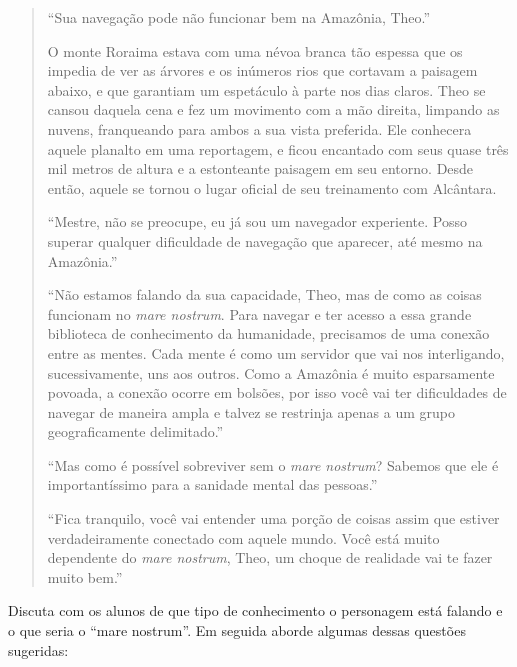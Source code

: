 \documentclass[12pt]{extarticle}
\begin{document}
\begin{quote} ``Sua navegação pode não funcionar bem na Amazônia, Theo.''

O monte Roraima estava com uma névoa branca tão espessa que os impedia de ver
  as árvores e os inúmeros rios que cortavam a paisagem abaixo, e que garantiam
  um espetáculo à parte nos dias claros. Theo se cansou daquela cena e fez um
  movimento com a mão direita, limpando as nuvens, franqueando para ambos a sua
  vista preferida. Ele conhecera aquele planalto em uma reportagem, e ficou
  encantado com seus quase três mil metros de altura e a estonteante paisagem
  em seu entorno. Desde então, aquele se tornou o lugar oficial de seu
  treinamento com Alcântara.

``Mestre, não se preocupe, eu já sou um navegador experiente. Posso superar
  qualquer dificuldade de navegação que aparecer, até mesmo na Amazônia.''

``Não estamos falando da sua capacidade, Theo, mas de como as coisas funcionam
  no \emph{mare nostrum}. Para navegar e ter acesso a essa grande biblioteca de
  conhecimento da humanidade, precisamos de uma conexão entre as mentes. Cada
  mente é como um servidor que vai nos interligando, sucessivamente, uns aos
  outros. Como a Amazônia é muito esparsamente povoada, a conexão ocorre em
  bolsões, por isso você vai ter dificuldades de navegar de maneira ampla e
  talvez se restrinja apenas a um grupo geograficamente delimitado.''

``Mas como é possível sobreviver sem o \emph{mare nostrum}? Sabemos que ele é
  importantíssimo para a sanidade mental das pessoas.''

``Fica tranquilo, você vai entender uma porção de coisas assim que estiver
  verdadeiramente conectado com aquele mundo. Você está muito dependente do
  \emph{mare nostrum}, Theo, um choque de realidade vai te fazer muito bem.''

\end{quote}

Discuta com os alunos de que tipo de conhecimento o personagem está falando e o
que seria o ``mare nostrum''. Em seguida aborde algumas dessas questões
sugeridas:
\end{document}
